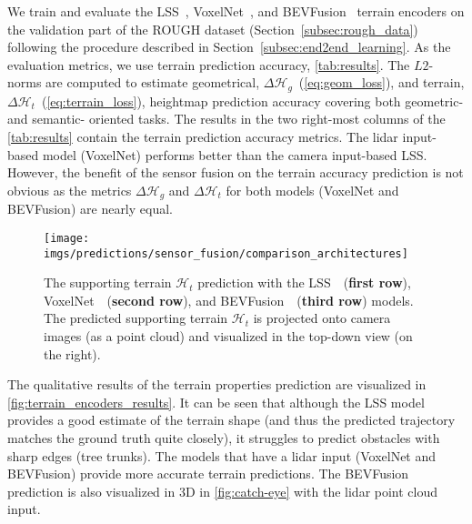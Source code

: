 We train and evaluate the LSS~\cite{philion2020lift}, VoxelNet~\cite{zhou2018voxelnet},
and BEVFusion~\cite{liu2023bevfusion} terrain encoders on the validation part of the ROUGH dataset (Section~\ref{subsec:rough_data})
following the procedure described in Section~\ref{subsec:end2end_learning}.
As the evaluation metrics, we use terrain prediction accuracy, \autoref{tab:results}.
The $L2$-norms are computed to estimate geometrical, $\Delta\mathcal{H}_g$~(\ref{eq:geom_loss}),
and terrain, $\Delta\mathcal{H}_t$~(\ref{eq:terrain_loss}), heightmap prediction accuracy
covering both geometric- and semantic- oriented tasks.
The results in the two right-most columns of the \autoref{tab:results} contain the terrain prediction accuracy metrics.
The lidar input-based model (VoxelNet) performs better than the camera input-based LSS.
However, the benefit of the sensor fusion on the terrain accuracy prediction is not obvious
as the metrics $\Delta\mathcal{H}_g$ and $\Delta\mathcal{H}_t$ for both models (VoxelNet and BEVFusion) are nearly equal.
\begin{figure}
    \centering
    \texttt{[image: imgs/predictions/sensor\_fusion/comparison\_architectures]}
    \caption{The supporting terrain $\mathcal{H}_t$ prediction with the LSS~\cite{philion2020lift}~(\textbf{first row}), VoxelNet~\cite{zhou2018voxelnet}~(\textbf{second row}),
        and BEVFusion~\cite{liu2023bevfusion}~(\textbf{third row}) models.
    The predicted supporting terrain $\mathcal{H}_t$ is projected onto camera images (as a point cloud)
        and visualized in the top-down view (on the right).}
    \label{fig:terrain_encoders_results}
\end{figure}
The qualitative results of the terrain properties prediction are visualized in \autoref{fig:terrain_encoders_results}.
It can be seen that although the LSS model provides a good estimate of the terrain shape
(and thus the predicted trajectory matches the ground truth quite closely),
it struggles to predict obstacles with sharp edges (tree trunks).
The models that have a lidar input (VoxelNet and BEVFusion) provide more accurate terrain predictions.
The BEVFusion prediction is also visualized in 3D in \autoref{fig:catch-eye} with the lidar point cloud input.
